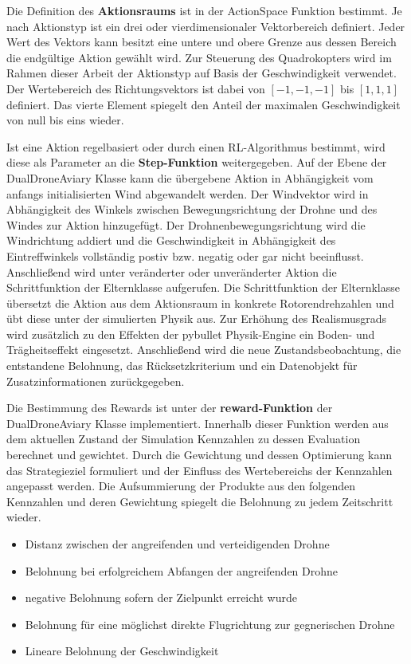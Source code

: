 Die Definition des \textbf{Aktionsraums} ist in der ActionSpace Funktion bestimmt.
Je nach Aktionstyp ist ein drei oder vierdimensionaler Vektorbereich definiert.
Jeder Wert des Vektors kann besitzt eine untere und obere Grenze aus dessen Bereich die endgültige Aktion gewählt wird.
Zur Steuerung des Quadrokopters wird im Rahmen dieser Arbeit der Aktionstyp auf Basis der Geschwindigkeit verwendet.
Der Wertebereich des Richtungsvektors ist dabei von $[-1,-1,-1]$ bis $[1,1,1]$ definiert. 
Das vierte Element spiegelt den Anteil der maximalen Geschwindigkeit von null bis eins wieder.

Ist eine Aktion regelbasiert oder durch einen RL-Algorithmus bestimmt, wird diese als Parameter an die \textbf{Step-Funktion} weitergegeben.
Auf der Ebene der DualDroneAviary Klasse kann die übergebene Aktion in Abhängigkeit vom anfangs initialisierten Wind abgewandelt werden.
Der Windvektor wird in Abhängigkeit des Winkels zwischen Bewegungsrichtung der Drohne und des Windes zur Aktion hinzugefügt.
Der Drohnenbewegungsrichtung wird die Windrichtung addiert und die Geschwindigkeit in Abhängigkeit des Eintreffwinkels vollständig postiv bzw. negatig oder gar nicht beeinflusst.
Anschließend wird unter veränderter oder unveränderter Aktion die Schrittfunktion der Elternklasse aufgerufen.
Die Schrittfunktion der Elternklasse übersetzt die Aktion aus dem Aktionsraum in konkrete Rotorendrehzahlen und übt diese unter der simulierten Physik aus.
Zur Erhöhung des Realismusgrads wird zusätzlich zu den Effekten der pybullet Physik-Engine ein Boden- und Trägheitseffekt eingesetzt.
Anschließend wird die neue Zustandsbeobachtung, die entstandene Belohnung, das Rücksetzkriterium und ein Datenobjekt für Zusatzinformationen zurückgegeben.

Die Bestimmung des Rewards ist unter der \textbf{reward-Funktion} der DualDroneAviary Klasse implementiert.
Innerhalb dieser Funktion werden aus dem aktuellen Zustand der Simulation Kennzahlen zu dessen Evaluation berechnet und gewichtet.
Durch die Gewichtung und dessen Optimierung kann das Strategieziel formuliert und der Einfluss des Wertebereichs der Kennzahlen angepasst werden.
Die Aufsummierung der Produkte aus den folgenden Kennzahlen und deren Gewichtung spiegelt die Belohnung zu jedem Zeitschritt wieder.
\begin{itemize}
    \item Distanz zwischen der angreifenden und verteidigenden Drohne
    \item Belohnung bei erfolgreichem Abfangen der angreifenden Drohne
    \item negative Belohnung sofern der Zielpunkt erreicht wurde
    \item Belohnung für eine möglichst direkte Flugrichtung zur gegnerischen Drohne
    \item Lineare Belohnung der Geschwindigkeit
\end{itemize}

